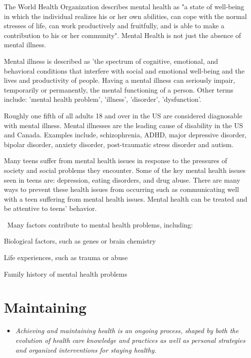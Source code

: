 The World Health Organization describes mental health as "a state of
well-being in which the individual realizes his or her own abilities,
can cope with the normal stresses of life, can work productively and
fruitfully, and is able to make a contribution to his or her community".
Mental Health is not just the absence of mental illness.

Mental illness is described as 'the spectrum of cognitive, emotional,
and behavioral conditions that interfere with social and emotional
well-being and the lives and productivity of people. Having a mental
illness can seriously impair, temporarily or permanently, the mental
functioning of a person. Other terms include: 'mental health problem',
'illness', 'disorder', 'dysfunction'.

Roughly one fifth of all adults 18 and over in the US are considered
diagnosable with mental illness. Mental illnesses are the leading cause
of disability in the US and Canada. Examples include, schizophrenia,
ADHD, major depressive disorder, bipolar disorder, anxiety disorder,
post-traumatic stress disorder and autism.

Many teens suffer from mental health issues in response to the pressures
of society and social problems they encounter. Some of the key mental
health issues seen in teens are: depression, eating disorders, and drug
abuse. There are many ways to prevent these health issues from occurring
such as communicating well with a teen suffering from mental health
issues. Mental health can be treated and be attentive to teens'
behavior.

~Many factors contribute to mental health problems, including:

Biological factors, such as genes or brain chemistry

Life experiences, such as trauma or abuse

Family history of mental health problems

\section{Maintaining}\label{maintaining}

\begin{itemize}
\item
  \emph{Achieving and maintaining health is an ongoing process, shaped
  by both the evolution of health care knowledge and practices as well
  as personal strategies and organized interventions for staying
  healthy.}
\end{itemize}

